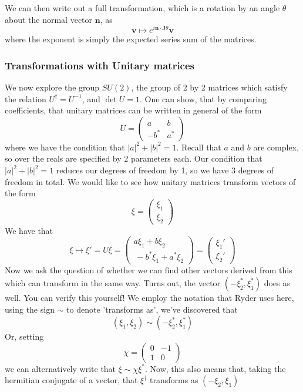 \documentclass[11pt, oneside]{article}   	%
\theoremstyle{newline}
\theoremstyle{newline}
\theoremstyle{newline}
\theoremstyle{newline}
\theoremstyle{newline}
\begin{document}
We can then write out a full transformation, which is a rotation by an angle $\theta$ about the normal vector $\mathbf{ n } $, as \[ \mathbf{ v} \mapsto e^{ i  \mathbf{n} \cdot \mathbf{J} \theta } \mathbf{ v} \] where the exponent is simply the expected series sum of the matrices.  

\subsubsection{Transformations with Unitary matrices} 
We now explore the group $SU(2)$, the group of 2 by 2 matrices which satisfy the relation $U^\dagger = U^ { -1} $, and $\det U = 1$. One can show, that by comparing coefficients, that unitary matrices can be written in general of the form 
\[ 
U = \begin{pmatrix} a & b \\  -b^* & a^* \end{pmatrix} 
\] 
where we have the condition that $|a|^2 + |b|^2 = 1 $. Recall that $a$ and $b$ are complex, so over the reals are specified by 2 parameters each. Our condition that $|a|^2 + |b|^2 = 1$ reduces our degrees of freedom by 1, so we have 3 degrees of freedom in total.  
We would like to see how unitary matrices transform vectors of the form \[ \xi = \begin{pmatrix} \xi_1 \\ \xi_2 \end{pmatrix} \]
We have that \[ \xi \mapsto \xi' = U \xi = \begin{pmatrix} 
a \xi_1 + b \xi_2 \\ \ - b^* \xi_1 + a^* \xi_2 \end{pmatrix} = \begin{pmatrix} \xi_1' \\ \xi_2' \end{pmatrix}  \]
Now we ask the question of whether we can find other vectors derived from this which can transform in the same way. Turns out, the vector $( - \xi_2^*, \xi_1^* ) $ does as well. You can verify this yourself! We employ the notation that Ryder uses here, using the sign $\sim $ to denote 'transforms as', we've discovered that \[ (\xi_1, \xi_2) \sim (  -\xi_2^*, \xi_1^* ) \] 
Or, setting \[ \chi = \begin{pmatrix} 0 & -1 \\  1 & 0 \end{pmatrix} \] we can alternatively write that $ \xi \sim \chi \xi^* $. Now, this also means that, taking the hermitian conjugate of a vector, that $\xi^\dagger $ transforms as $ ( - \xi_2 , \xi_1 ) $ 
\end{document}
